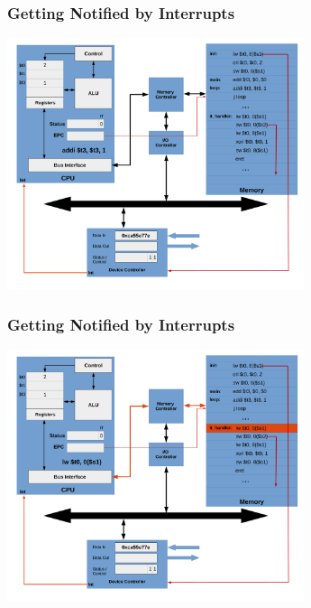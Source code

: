 \documentclass{beamer}
\begin{document}
\begin{frame}[fragile]
\frametitle{Getting Notified by Interrupts}

\begin{center}
\vspace*{-0.23cm}
\hspace*{-1cm}\includegraphics[width=8.7cm]{interrupt_waiting14.pdf}
\end{center}

\end{frame}

\begin{frame}[fragile]
\frametitle{Getting Notified by Interrupts}

\begin{center}
\vspace*{-0.23cm}
\hspace*{-1cm}\includegraphics[width=8.7cm]{interrupt_waiting15.pdf}
\end{center}

\end{frame}
\end{document}
